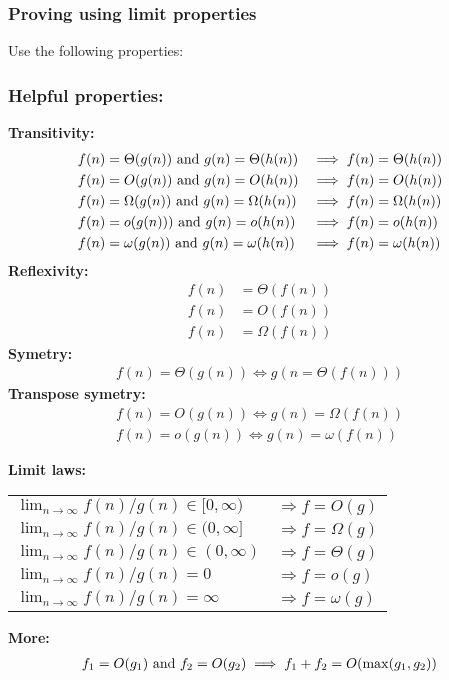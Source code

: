 \documentclass{article}
\begin{document}
            \subsubsection{Proving using limit properties}
            Use the following properties:
            \subsubsection{Helpful properties:}
            \textbf{Transitivity: }
            \begin{align*}
                f(n) &= \Theta(g(n)) \text{ and } g(n) = \Theta(h(n)) &\implies f(n) &= \Theta(h(n))\\
                f(n) &= O(g(n)) \text{ and } g(n) = O(h(n)) &\implies f(n) &= O(h(n))\\
                f(n) &= \Omega(g(n)) \text{ and } g(n) = \Omega(h(n)) &\implies f(n) &= \Omega(h(n))\\
                f(n) &= o(g(n))) \text{ and } g(n) = o(h(n)) &\implies f(n) &= o(h(n))\\
                f(n) &= \omega(g(n)) \text{ and } g(n) = \omega(h(n)) &\implies f(n) &= \omega (h(n))
            \end{align*}
            \textbf{Reflexivity: }
            \begin{align*}
                f(n) &= \Theta(f(n))\\
                f(n) &= O(f(n))\\
                f(n) &= \Omega(f(n))
            \end{align*}
            \textbf{Symetry: }
            \begin{align*}
                f(n) = \Theta (g(n)) \iff g(n = \Theta(f(n)))
            \end{align*}
            \textbf{Transpose symetry: }
            \begin{align*}
                f(n) = O(g(n)) \iff g(n) = \Omega(f(n))\\
                f(n) = o(g(n)) \iff g(n) = \omega (f(n))
            \end{align*}

            \textbf{Limit laws: }

            {\centering
            	\begin{tabular}{ll}
            	$\lim_{n\to\infty}f(n)/g(n) \in[0,\infty)$ &	$\Rightarrow f= O(g)$ \\
            	$\lim_{n\to\infty}f(n)/g(n) \in (0,\infty] $ &		$\Rightarrow f= \Omega(g)$ \\
            	$\lim_{n\to\infty}f(n)/g(n) \in (0,\infty)$  &	$\Rightarrow f= \Theta(g)$ \\
            	$\lim_{n\to\infty}f(n)/g(n) = 0$  &	$\Rightarrow f= o(g)$ \\
            	$\lim_{n\to\infty}f(n)/g(n) = \infty$  &	$\Rightarrow f= \omega(g)$
            	\end{tabular}\par
            }
            \textbf{More: }
            \begin{align*}
                f_1 = O(g_1) \text{ and } f_2 = O(g_2) \implies f_1+f_2= O(\max(g_1,g_2))
            \end{align*}
\end{document}
